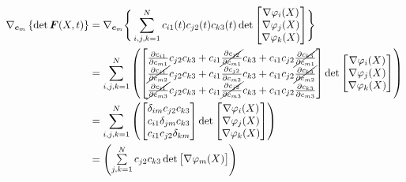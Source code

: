\begin{align}
  \nabla_{\boldsymbol{c}_m}\left\{\det \boldsymbol{F}(X,t)\right\}
  &=\nabla_{\boldsymbol{c}_m}\Bigg\{
      \sum\limits_{i,j,k=1}^{N}{
      c_{i1}(t) c_{j2}(t) c_{k3}(t)
      \det \begin{bmatrix}
              \nabla \varphi_{i}(X) \\
              \nabla \varphi_{j}(X) \\
              \nabla \varphi_{k}(X)
            \end{bmatrix}
      }
    \Bigg\} \nonumber\\
  &=\sum\limits_{i,j,k=1}^{N}{\left(
      \begin{bmatrix}
        \frac{\partial c_{i1}}{\partial c_{m1}}c_{j2}c_{k3} + c_{i1} \cancel{\frac{\partial c_{j2}}{\partial c_{m1}}} c_{k3} 
          + c_{i1}c_{j2}\cancel{\frac{\partial c_{k3}}{\partial c_{m1}}} \\
        \cancel{\frac{\partial c_{i1}}{\partial c_{m2}}}c_{j2}c_{k3} + c_{i1} \frac{\partial c_{j2}}{\partial c_{m2}} c_{k3} 
          + c_{i1}c_{j2}\cancel{\frac{\partial c_{k3}}{\partial c_{m2}}} \\
        \cancel{\frac{\partial c_{i1}}{\partial c_{m3}}}c_{j2}c_{k3} + c_{i1} \cancel{\frac{\partial c_{j2}}{\partial c_{m3}}} c_{k3} 
        + c_{i1}c_{j2}\frac{\partial c_{k3}}{\partial c_{m3}}
      \end{bmatrix}
      \det \begin{bmatrix}
              \nabla \varphi_{i}(X) \\
              \nabla \varphi_{j}(X) \\
              \nabla \varphi_{k}(X)
            \end{bmatrix}
      \right)}
      \nonumber\\
  &=\sum\limits_{i,j,k=1}^{N}{\left(
      \begin{bmatrix}
        \delta_{im}c_{j2}c_{k3}\\
        c_{i1}\delta_{jm}c_{k3}\\
        c_{i1}c_{j2}\delta_{km}
      \end{bmatrix}
      \det \begin{bmatrix}
              \nabla \varphi_{i}(X) \\
              \nabla \varphi_{j}(X) \\
              \nabla \varphi_{k}(X)
            \end{bmatrix}
      \right)}
      \nonumber\\
  &=\begin{pmatrix}
      \sum\limits_{j,k=1}^{N}{
        c_{j2}c_{k3} \det \begin{bmatrix}
                            \nabla \varphi_{m}(X) \\

\end{bmatrix}}
\end{pmatrix}
\end{align}
